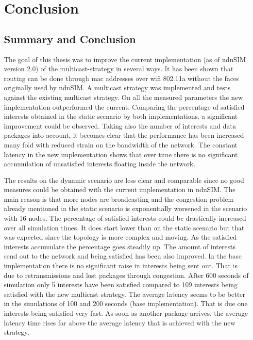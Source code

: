 \chapter{Conclusion}


\section{Summary and Conclusion}

The goal of this thesis was to improve the current implementation (as of ndnSIM version 2.0) of the multicast-strategy in several ways. It has been shown that routing can be done through mac addresses over wifi 802.11a without the faces originally used by ndnSIM. A multicast strategy was implemented and tests against the existing multicast strategy. On all the measured parameters the new implementation outperformed the current.
Comparing the percentage of satisfied interests obtained in the static scenario by both implementations, a significant improvement could be observed. Taking also the number of interests and data packages into account, it becomes clear that the performance has been increased many fold with reduced strain on the bandwidth of the network. The constant latency in the new implementation shows that over time there is no significant accumulation of unsatisfied interests floating inside the network.

\vspace{5mm} %

The results on the dynamic scenario are less clear and comparable since no good measures could be obtained with the current implementation in ndnSIM. The main reason is that more nodes are broadcasting and the congestion problem already mentioned in the static scenario is exponentially worsened in the scenario with 16 nodes. The percentage of satisfied interests could be drastically increased over all simulation times. It does start lower than on the static scenario but that was expected since the topology is more complex and moving. As the satisfied interests accumulate the percentage goes steadily up. The amount of interests send out to the network and being satisfied has been also improved. In the base implementation there is no significant raise in interests being sent out. That is due to retransmissions and lost packages through congestion. After 600 seconds of simulation only 5 interests have been satisfied compared to 109 interests being satisfied with the new multicast strategy. The average latency seems to be better in the simulations of 100 and 200 seconds (base implementation). That is due one interests being satisfied very fast. As soon as another package arrives, the average latency time rises far above the average latency that is achieved with the new strategy.

